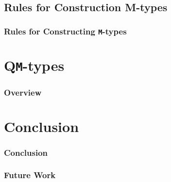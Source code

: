 \documentclass[xelatex,mathserif,serif,notheorems]{beamer} %
\theoremstyle{plain} %
\theoremstyle{definition}
\theoremstyle{remark}
\begin{document}
\subsection{Rules for Construction M-types}
\begin{frame}
  \frametitle{Rules for Constructing \texttt{M}-types}
  
\end{frame}

\section{Q\texttt{M}-types}

\begin{frame}
  \frametitle{Overview}
  \tableofcontents[currentsection,subsubsectionstyle=hide]
\end{frame}

\section{Conclusion}
\begin{frame}
  \frametitle{Conclusion}
\end{frame}

\begin{frame}
  \frametitle{Future Work}
\end{frame}
\end{document}
